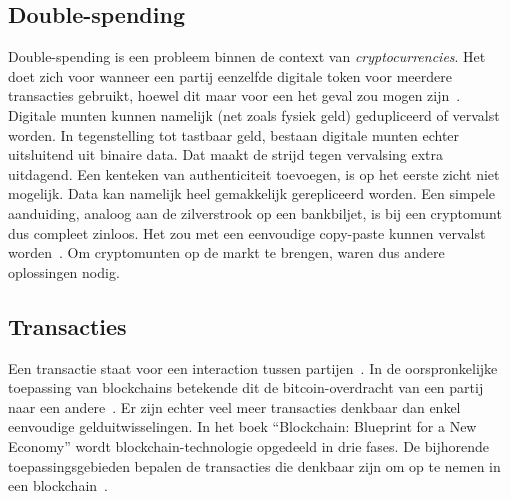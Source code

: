 \subsection{Double-spending}
\label{sub:double-spending}

Double-spending is een probleem binnen de context van \textit{cryptocurrencies}. Het doet zich voor wanneer een partij eenzelfde digitale token voor meerdere transacties gebruikt, hoewel dit maar voor een het geval zou mogen zijn~\autocite{Chohan2021}. Digitale munten kunnen namelijk (net zoals fysiek geld) gedupliceerd of vervalst worden. In tegenstelling tot tastbaar geld, bestaan digitale munten echter uitsluitend uit binaire data. Dat maakt de strijd tegen vervalsing extra uitdagend. Een kenteken van authenticiteit toevoegen, is op het eerste zicht niet mogelijk. Data kan namelijk heel gemakkelijk gerepliceerd worden. Een simpele aanduiding, analoog aan de zilverstrook op een bankbiljet, is bij een cryptomunt dus compleet zinloos. Het zou met een eenvoudige copy-paste kunnen vervalst worden~\autocite{Hoepman2008}. Om cryptomunten op de markt te brengen, waren dus andere oplossingen nodig.


\subsection{Transacties}
\label{sub:transacties}

Een transactie staat voor een interaction tussen partijen~\autocite{Salem2008}. In de oorspronkelijke toepassing van blockchains betekende dit de bitcoin-overdracht van een partij naar een andere~\autocite{Pierro2017}. Er zijn echter veel meer transacties denkbaar dan enkel eenvoudige gelduitwisselingen.
In het boek ``Blockchain: Blueprint for a New Economy'' wordt blockchain-technologie opgedeeld in drie fases. De bijhorende toepassingsgebieden bepalen de transacties die denkbaar zijn om op te nemen in een blockchain~\autocite{Swan2015}.

